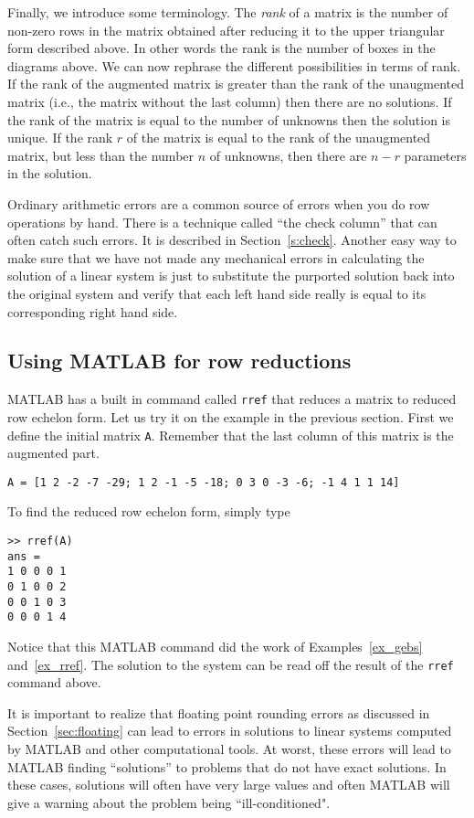 Finally, we introduce some terminology.
The {\it rank} of a matrix is the number of non-zero rows in the matrix obtained
after reducing it to the upper triangular form described above. In other words
the rank is the number of boxes in the diagrams above. We can now rephrase the
different possibilities in terms of rank. If the rank of the augmented matrix is
greater than the rank of the unaugmented matrix (i.e., the matrix without the
last column) then there are no solutions. If the rank of the matrix is equal
to the number of unknowns then the solution is unique. If the rank $r$ of the matrix
is equal to the rank of the unaugmented matrix, but less than the number $n$ of
unknowns, then there are $n-r$ parameters in the solution.

Ordinary arithmetic errors are a common source of errors when you do row operations
by hand. There is a technique called ``the check column'' that can often catch such errors. It is described in Section~\ref{s:check}. Another easy way to make sure that we have not made any mechanical errors in calculating the solution of a linear system is just to substitute the purported solution
back into the original system and verify that each left hand side really is equal to its corresponding
right hand side.

\subsection{Using MATLAB for row reductions}

MATLAB has a built in command
called {\tt rref} that reduces a matrix to reduced row echelon form.
Let us  try it on the example in the previous section. First we define
the initial matrix {\tt A}. Remember that the last column of this matrix is
the augmented part.
\begin{verbatim} 
A = [1 2 -2 -7 -29; 1 2 -1 -5 -18; 0 3 0 -3 -6; -1 4 1 1 14]
\end{verbatim}
To find the reduced row echelon form, simply type
\begin{verbatim}
>> rref(A)
ans = 
1 0 0 0 1
0 1 0 0 2
0 0 1 0 3
0 0 0 1 4
\end{verbatim}
Notice that this MATLAB command did the work of Examples~\ref{ex_gebs} 
and~\ref{ex_rref}. The solution to the system can be read off the result
of the {\tt rref} command above. 

It is important to realize that floating point rounding errors as discussed in 
Section~\ref{sec:floating} can lead to errors in solutions to linear systems computed 
by MATLAB and other computational tools. At worst, these errors will lead to MATLAB 
finding ``solutions'' to problems that do not have exact solutions. In these cases, 
solutions will often have very large values and often MATLAB will give a warning 
about the problem being ``ill-conditioned".   

